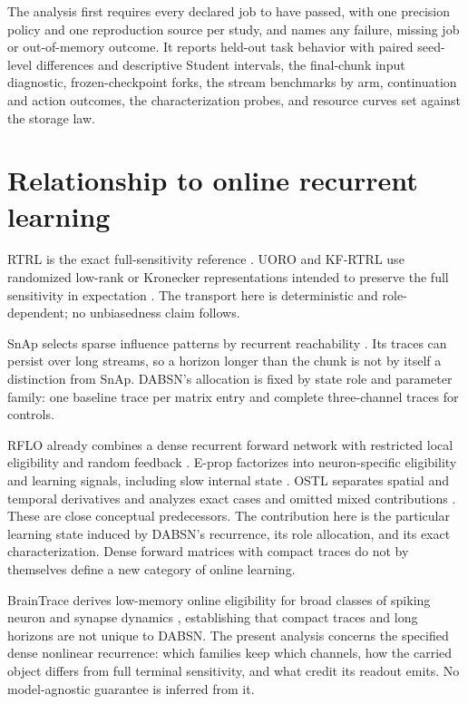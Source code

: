 \documentclass[11pt]{article}
\theoremstyle{definition}
\begin{document}
The analysis first requires every declared job to have passed, with one precision
policy and one reproduction source per study, and names any failure, missing job
or out-of-memory outcome. It reports held-out task behavior with paired seed-level
differences and descriptive Student intervals, the final-chunk input diagnostic,
frozen-checkpoint forks, the stream benchmarks by arm, continuation and
action outcomes, the characterization probes, and resource curves set against the
storage law.

\FloatBarrier

\section{Relationship to online recurrent learning}

RTRL is the exact full-sensitivity reference \citep{williams1989rtrl}. UORO and
KF-RTRL use randomized low-rank or Kronecker representations intended to preserve
the full sensitivity in expectation \citep{tallec2018uoro,mujika2018kfrtrl}. The
transport here is deterministic and role-dependent; no unbiasedness claim follows.

SnAp selects sparse influence patterns by recurrent reachability
\citep{menick2021snap}. Its traces can persist over long streams, so a horizon
longer than the chunk is not by itself a distinction from SnAp. DABSN's allocation
is fixed by state role and parameter family: one baseline trace per matrix entry
and complete three-channel traces for controls.

RFLO already combines a dense recurrent forward network with restricted local
eligibility and random feedback \citep{murray2019rflo}. E-prop factorizes into
neuron-specific eligibility and learning signals, including slow internal state
\citep{bellec2020eprop}. OSTL separates spatial and temporal derivatives and
analyzes exact cases and omitted mixed contributions \citep{bohnstingl2023ostl}.
These are close conceptual predecessors. The contribution here is the particular
learning state induced by DABSN's recurrence, its role allocation, and its exact
characterization. Dense forward matrices with compact traces do not by themselves
define a new category of online learning.

BrainTrace derives low-memory online eligibility for broad classes of spiking
neuron and synapse dynamics \citep{wang2026braintrace}, establishing that compact
traces and long horizons are not unique to DABSN. The present analysis concerns
the specified dense nonlinear recurrence: which families keep which channels, how
the carried object differs from full terminal sensitivity, and what credit its
readout emits. No model-agnostic guarantee is inferred from it.
\end{document}
